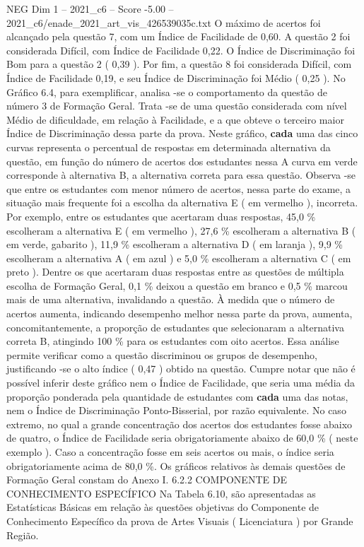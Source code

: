 \begin{textsample}{NEG Dim 1 – 2021\_c6 – Score -5.00 – 2021\_c6/enade\_2021\_art\_vis\_426539035c.txt}
O máximo de acertos foi alcançado pela questão 7, com um Índice de Facilidade de 0,60.
A questão 2 foi considerada Difícil, com Índice de Facilidade 0,22.
O Índice de Discriminação foi Bom para a questão 2 ( 0,39 ).
Por fim, a questão 8 foi considerada Difícil, com Índice de Facilidade 0,19, e seu Índice de Discriminação foi Médio ( 0,25 ).
No Gráfico 6.4, para exemplificar, analisa -se o comportamento da questão de número 3 de Formação Geral.
Trata -se de uma questão considerada com nível Médio de dificuldade, em relação à Facilidade, e a que obteve o terceiro maior Índice de Discriminação dessa parte da prova.
Neste gráfico, \textbf{cada} uma das cinco curvas representa o percentual de respostas em determinada alternativa da questão, em função do número de acertos dos estudantes nessa A curva em verde corresponde à alternativa B, a alternativa correta para essa questão.
Observa -se que entre os estudantes com menor número de acertos, nessa parte do exame, a situação mais frequente foi a escolha da alternativa E ( em vermelho ), incorreta.
Por exemplo, entre os estudantes que acertaram duas respostas, 45,0 \% escolheram a alternativa E ( em vermelho ), 27,6 \% escolheram a alternativa B ( em verde, gabarito ), 11,9 \% escolheram a alternativa D ( em laranja ), 9,9 \% escolheram a alternativa A ( em azul ) e 5,0 \% escolheram a alternativa C ( em preto ).
Dentre os que acertaram duas respostas entre as questões de múltipla escolha de Formação Geral, 0,1 \% deixou a questão em branco e 0,5 \% marcou mais de uma alternativa, invalidando a questão.
À medida que o número de acertos aumenta, indicando desempenho melhor nessa parte da prova, aumenta, concomitantemente, a proporção de estudantes que selecionaram a alternativa correta B, atingindo 100 \% para os estudantes com oito acertos.
Essa análise permite verificar como a questão discriminou os grupos de desempenho, justificando -se o alto índice ( 0,47 ) obtido na questão.
Cumpre notar que não é possível inferir deste gráfico nem o Índice de Facilidade, que seria uma média da proporção ponderada pela quantidade de estudantes com \textbf{cada} uma das notas, nem o Índice de Discriminação Ponto-Bisserial, por razão equivalente.
No caso extremo, no qual a grande concentração dos acertos dos estudantes fosse abaixo de quatro, o Índice de Facilidade seria obrigatoriamente abaixo de 60,0 \% ( neste exemplo ).
Caso a concentração fosse em seis acertos ou mais, o índice seria obrigatoriamente acima de 80,0 \%.
Os gráficos relativos às demais questões de Formação Geral constam do Anexo I. 6.2.2 COMPONENTE DE CONHECIMENTO ESPECÍFICO Na Tabela 6.10, são apresentadas as Estatísticas Básicas em relação às questões objetivas do Componente de Conhecimento Específico da prova de Artes Visuais ( Licenciatura ) por Grande Região.

\end{textsample}
